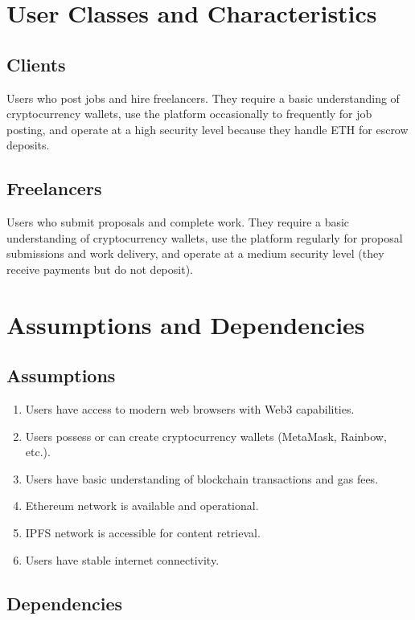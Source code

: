 \section{User Classes and Characteristics}

\subsection{Clients}

Users who post jobs and hire freelancers. They require a basic understanding of cryptocurrency wallets, use the platform occasionally to frequently for job posting, and operate at a high security level because they handle ETH for escrow deposits.

\subsection{Freelancers}

Users who submit proposals and complete work. They require a basic understanding of cryptocurrency wallets, use the platform regularly for proposal submissions and work delivery, and operate at a medium security level (they receive payments but do not deposit).

\section{Assumptions and Dependencies}

\subsection{Assumptions}

\begin{enumerate}
    \item Users have access to modern web browsers with Web3 capabilities.
    \item Users possess or can create cryptocurrency wallets (MetaMask, Rainbow, etc.).
    \item Users have basic understanding of blockchain transactions and gas fees.
    \item Ethereum network is available and operational.
    \item IPFS network is accessible for content retrieval.
    \item Users have stable internet connectivity.
\end{enumerate}

\subsection{Dependencies}

